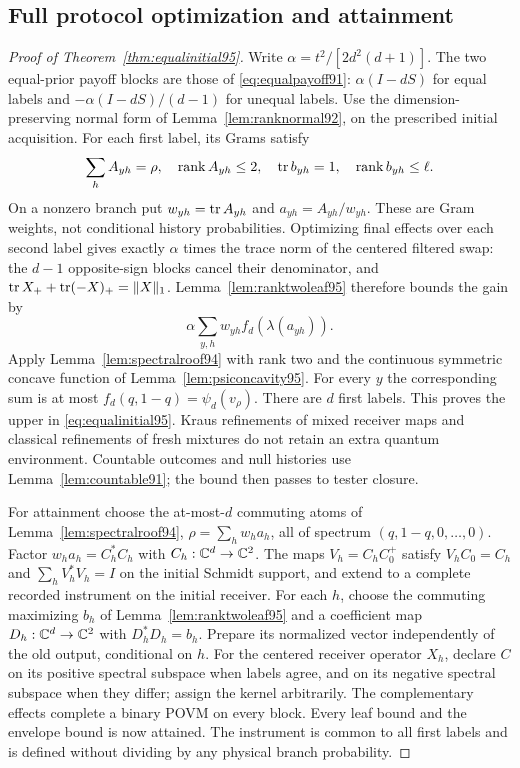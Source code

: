 \subsection{Full protocol optimization and attainment}
\begin{proof}[Proof of Theorem~\ref{thm:equalinitial95}]
Write $\alpha=t^2/[2d^2(d+1)]$.
The two equal-prior payoff blocks are those of
\eqref{eq:equalpayoff91}: $\alpha(I-dS)$ for equal labels and
$-\alpha(I-dS)/(d-1)$ for unequal labels.
Use the dimension-preserving normal form of
Lemma~\ref{lem:ranknormal92}, on the prescribed initial acquisition.
For each first label, its Grams satisfy
\[
 \sum_h A_{yh}=\rho,\quad \operatorname{rank}A_{yh}\le2,
 \quad \operatorname{tr} b_{yh}=1,\quad\operatorname{rank}b_{yh}\le\ell.
\]
On a nonzero branch put $w_{yh}=\operatorname{tr} A_{yh}$ and
$a_{yh}=A_{yh}/w_{yh}$.  These are Gram weights, not conditional
history probabilities.  Optimizing final effects over each second
label gives exactly $\alpha$ times the trace norm of the centered
filtered swap: the $d-1$ opposite-sign blocks cancel their denominator,
and $\operatorname{tr} X_++\operatorname{tr}(-X)_+=\|X\|_1$.
Lemma~\ref{lem:ranktwoleaf95} therefore bounds the gain by
\[
 \alpha\sum_{y,h}w_{yh}f_d(\lambda(a_{yh})).
\]
Apply Lemma~\ref{lem:spectralroof94} with rank two and the
continuous symmetric concave function of
Lemma~\ref{lem:psiconcavity95}.  For every $y$ the corresponding
sum is at most $f_d(q,1-q)=\psi_d(v_\rho)$.
There are $d$ first labels.  This proves the upper in
\eqref{eq:equalinitial95}.  Kraus refinements of mixed receiver maps
and classical refinements of fresh mixtures do not retain an extra
quantum environment.  Countable outcomes and null histories use
Lemma~\ref{lem:countable91}; the bound then passes to tester closure.

For attainment choose the at-most-$d$ commuting atoms of
Lemma~\ref{lem:spectralroof94},
$\rho=\sum_hw_h a_h$, all of spectrum $(q,1-q,0,\ldots,0)$.
Factor $w_h a_h=C_h^*C_h$ with $C_h:\mathbb C^d\to\mathbb C^2$.
The maps $V_h=C_hC_0^+$ satisfy
$V_hC_0=C_h$ and $\sum_hV_h^*V_h=I$ on the initial Schmidt
support, and extend to a complete recorded instrument on the initial
receiver.  For each $h$, choose the commuting maximizing $b_h$
of Lemma~\ref{lem:ranktwoleaf95} and a coefficient map
$D_h:\mathbb C^d\to\mathbb C^2$ with $D_h^*D_h=b_h$.
Prepare its normalized vector independently of the old output,
conditional on $h$.  For the centered receiver operator $X_h$,
declare $C$ on its positive spectral subspace when labels agree,
and on its negative spectral subspace when they differ; assign the
kernel arbitrarily.  The complementary effects complete a binary
POVM on every block.  Every leaf bound and the envelope bound is now
attained.  The instrument is common to all first labels and is defined
without dividing by any physical branch probability.


\end{proof}
